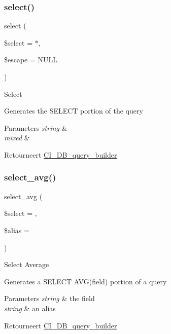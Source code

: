 \subsubsection{\texorpdfstring{select()}{select()}}
{\footnotesize\ttfamily select (\begin{DoxyParamCaption}\item[{}]{\$select = {\ttfamily \textquotesingle{}$\ast$\textquotesingle{}},  }\item[{}]{\$escape = {\ttfamily NULL} }\end{DoxyParamCaption})}

Select

Generates the S\+E\+L\+E\+CT portion of the query


\begin{DoxyParams}{Parameters}
{\em string} & \\
\hline
{\em mixed} & \\
\hline
\end{DoxyParams}
\begin{DoxyReturn}{Retourneert}
\mbox{\hyperlink{class_c_i___d_b__query__builder}{C\+I\+\_\+\+D\+B\+\_\+query\+\_\+builder}} 
\end{DoxyReturn}
\mbox{\label{class_c_i___d_b__query__builder_a0377f6833e394c977823e21413772761}} 
\subsubsection{\texorpdfstring{select\_avg()}{select\_avg()}}
{\footnotesize\ttfamily select\+\_\+avg (\begin{DoxyParamCaption}\item[{}]{\$select = {\ttfamily \textquotesingle{}\textquotesingle{}},  }\item[{}]{\$alias = {\ttfamily \textquotesingle{}\textquotesingle{}} }\end{DoxyParamCaption})}

Select Average

Generates a S\+E\+L\+E\+CT A\+V\+G(field) portion of a query


\begin{DoxyParams}{Parameters}
{\em string} & the field \\
\hline
{\em string} & an alias \\
\hline
\end{DoxyParams}
\begin{DoxyReturn}{Retourneert}
\mbox{\hyperlink{class_c_i___d_b__query__builder}{C\+I\+\_\+\+D\+B\+\_\+query\+\_\+builder}} 
\end{DoxyReturn}
\mbox{\label{class_c_i___d_b__query__builder_a4eac30ba8703ba8f62664e3b4ea1a177}} 
